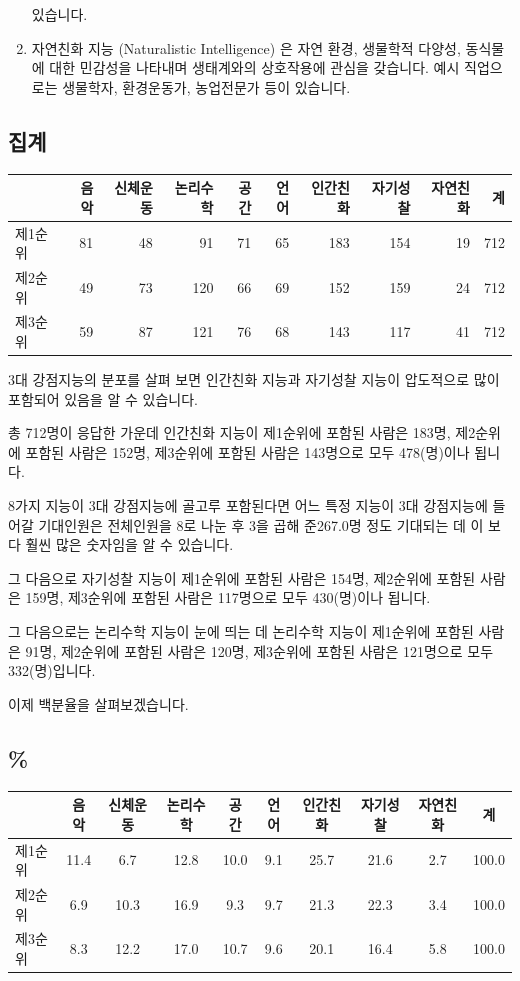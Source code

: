 \documentclass[
]{book}
\begin{document}
\begin{enumerate}
있습니다.
\item
  자연친화 지능 (Naturalistic Intelligence) 은 자연 환경, 생물학적 다양성, 동식물에 대한 민감성을 나타내며 생태계와의 상호작용에 관심을 갖습니다. 예시 직업으로는 생물학자, 환경운동가, 농업전문가 등이 있습니다.
\end{enumerate}

\subsection{집계}\label{uxc9d1uxacc4-36}

\begin{tabular}{l|r|r|r|r|r|r|r|r|r}
\hline
  & 음악 & 신체운동 & 논리수학 & 공간 & 언어 & 인간친화 & 자기성찰 & 자연친화 & 계\\
\hline
제1순위 & 81 & 48 & 91 & 71 & 65 & 183 & 154 & 19 & 712\\
\hline
제2순위 & 49 & 73 & 120 & 66 & 69 & 152 & 159 & 24 & 712\\
\hline
제3순위 & 59 & 87 & 121 & 76 & 68 & 143 & 117 & 41 & 712\\
\hline
\end{tabular}

3대 강점지능의 분포를 살펴 보면 인간친화 지능과 자기성찰 지능이 압도적으로 많이 포함되어 있음을 알 수 있습니다.

총 712명이 응답한 가운데 인간친화 지능이 제1순위에 포함된 사람은 183명, 제2순위에 포함된 사람은 152명, 제3순위에 포함된 사람은 143명으로 모두 478(명)이나 됩니다.

8가지 지능이 3대 강점지능에 골고루 포함된다면 어느 특정 지능이 3대 강점지능에 들어갈 기대인원은 전체인원을 8로 나눈 후 3을 곱해 준267.0명 정도 기대되는 데 이 보다 훨씬 많은 숫자임을 알 수 있습니다.

그 다음으로
자기성찰 지능이 제1순위에 포함된 사람은 154명, 제2순위에 포함된 사람은 159명, 제3순위에 포함된 사람은 117명으로 모두 430(명)이나 됩니다.

그 다음으로는 논리수학 지능이 눈에 띄는 데 논리수학 지능이 제1순위에 포함된 사람은 91명, 제2순위에 포함된 사람은 120명, 제3순위에 포함된 사람은 121명으로 모두 332(명)입니다.

이제 백분율을 살펴보겠습니다.

\subsection{\%}\label{section-19}

\begin{tabular}{l|c|c|c|c|c|c|c|c|c}
\hline
  & 음악 & 신체운동 & 논리수학 & 공간 & 언어 & 인간친화 & 자기성찰 & 자연친화 & 계\\
\hline
제1순위 & 11.4 & 6.7 & 12.8 & 10.0 & 9.1 & 25.7 & 21.6 & 2.7 & 100.0\\
\hline
제2순위 & 6.9 & 10.3 & 16.9 & 9.3 & 9.7 & 21.3 & 22.3 & 3.4 & 100.0\\
\hline
제3순위 & 8.3 & 12.2 & 17.0 & 10.7 & 9.6 & 20.1 & 16.4 & 5.8 & 100.0\\
\hline
\end{tabular}
\end{document}
